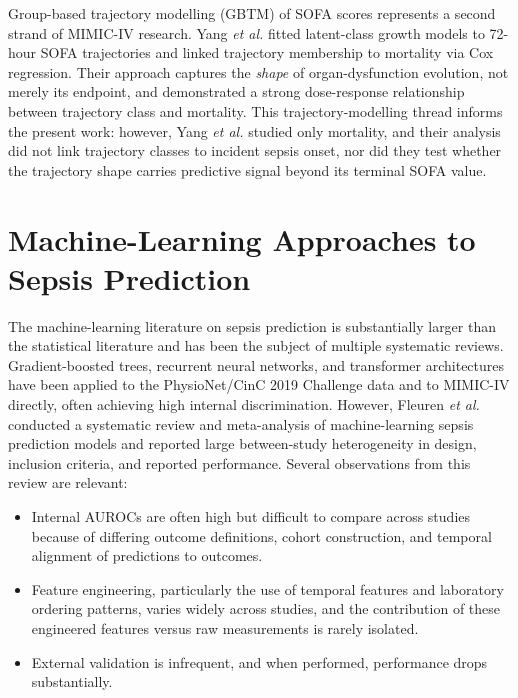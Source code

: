 Group-based trajectory modelling (GBTM) of SOFA scores represents a second
strand of MIMIC-IV research. Yang \emph{et al.} \cite{yang2022gbtm} fitted
latent-class growth models to 72-hour SOFA trajectories and linked trajectory
membership to mortality via Cox regression. Their approach captures the
\emph{shape} of organ-dysfunction evolution, not merely its endpoint, and
demonstrated a strong dose-response relationship between trajectory class and
mortality. This trajectory-modelling thread informs the present work: however,
Yang \emph{et al.} studied only mortality, and their analysis did not link
trajectory classes to incident sepsis onset, nor did they test whether the
trajectory shape carries predictive signal beyond its terminal SOFA value.

\section{Machine-Learning Approaches to Sepsis Prediction}
\label{sec:ml_onset}

The machine-learning literature on sepsis prediction is substantially larger
than the statistical literature and has been the subject of multiple systematic
reviews. Gradient-boosted trees, recurrent neural networks, and transformer
architectures have been applied to the PhysioNet/CinC 2019 Challenge data
\cite{reyna2020physionet} and to MIMIC-IV directly, often achieving high
internal discrimination. However, Fleuren \emph{et al.} \cite{fleuren2020ml}
conducted a systematic review and meta-analysis of machine-learning sepsis
prediction models and reported large between-study heterogeneity in design,
inclusion criteria, and reported performance. Several observations from this
review are relevant:

\begin{itemize}
  \item Internal AUROCs are often high but difficult to compare across studies
  because of differing outcome definitions, cohort construction, and temporal
  alignment of predictions to outcomes.
  \item Feature engineering, particularly the use of temporal features and
  laboratory ordering patterns, varies widely across studies, and the
  contribution of these engineered features versus raw measurements is rarely
  isolated.
  \item External validation is infrequent, and when performed, performance
  drops substantially.
\end{itemize}

